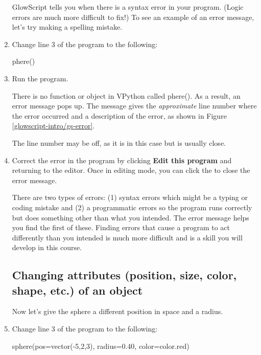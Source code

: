 \begin{enumerate}
	GlowScript tells you when there is a syntax error in  your program. (Logic errors are much more difficult to fix!) To see an example of an error message, let's try making a spelling mistake.
	
	\item Change line 3 of the program to the following:
	
\begin{myvpython}
phere()
\end{myvpython}

	\item Run the program.

There is no function or object in VPython called phere(). As a result, an error message pops up. The message gives the \emph{approximate} line number where the error occurred and a description of the error, as shown in Figure \ref{glowscript-intro/gs-error}.


The line number may be off, as it is in this case but is usually close.

	\item Correct the error in the program by clicking {\bf Edit this program} and returning to the editor. Once in editing mode, you can click the  to close the error message.

There are two types of errors: (1) syntax errors which might be a typing or coding mistake and (2) a programmatic errors so the program runs correctly but does something other than what you intended. The error message helps you find the first of these. Finding errors that cause a program to act differently than you intended is much more difficult and is a skill you will develop in this course.
	
	\subsection*{Changing attributes (position, size, color, shape, etc.) of an object}
	
Now let's give the sphere a different position in space and a radius. 

	\item Change line 3 of the program to the following:

\begin{myvpython}	
sphere(pos=vector(-5,2,3), radius=0.40, color=color.red)
\end{myvpython}


\end{enumerate}
